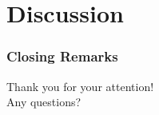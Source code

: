 \documentclass{my-Presentation}
\begin{document}
\section{Discussion}
\begin{frame}
  \frametitle{}

  

\end{frame}



  




\begin{frame}
  \frametitle{Closing Remarks}
  \centering
  {\Large Thank you for your attention!}\\
  \vspace{2em}
  {\large Any questions?}
\end{frame}


\end{document}
